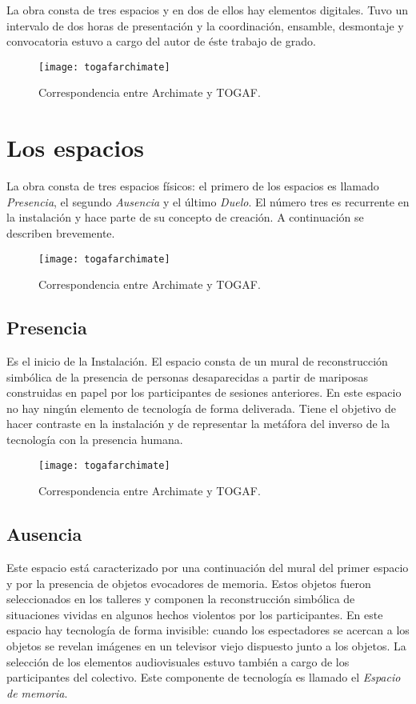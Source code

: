 La obra consta de tres espacios y en dos de ellos hay elementos digitales. Tuvo un intervalo de dos horas de presentación y la coordinación, ensamble, desmontaje y convocatoria estuvo a cargo del autor de éste trabajo de grado.

\begin{figure}[h]\label{togafarchimate}
\centering
\texttt{[image: togafarchimate]}
\caption{Correspondencia entre Archimate y TOGAF.}
\end{figure}

\section{Los espacios}

La obra consta de tres espacios físicos: el primero de los espacios es llamado \textit{Presencia}, el segundo \textit{Ausencia} y el último \textit{Duelo}. El número tres es recurrente en la instalación y hace parte de su concepto de creación. A continuación se describen brevemente.

\begin{figure}[h]\label{togafarchimate}
\centering
\texttt{[image: togafarchimate]}
\caption{Correspondencia entre Archimate y TOGAF.}
\end{figure}

\subsection{Presencia}

Es el inicio de la Instalación. El espacio consta de un mural de reconstrucción simbólica de la presencia de personas desaparecidas a partir de mariposas construidas en papel por los participantes de sesiones anteriores. En este espacio no hay ningún elemento de tecnología de forma deliverada. Tiene el objetivo de hacer contraste en la instalación y de representar la metáfora del inverso de la tecnología con la presencia humana. 

\begin{figure}[h]\label{togafarchimate}
\centering
\texttt{[image: togafarchimate]}
\caption{Correspondencia entre Archimate y TOGAF.}
\end{figure}

\subsection{Ausencia}

Este espacio está caracterizado por una continuación del mural del primer espacio y por la presencia de objetos evocadores de memoria. Estos objetos fueron seleccionados en los talleres y componen la reconstrucción simbólica de situaciones vividas en algunos hechos violentos por los participantes. En este espacio hay tecnología de forma invisible: cuando los espectadores se acercan a los objetos se revelan imágenes en un televisor viejo dispuesto junto a los objetos. La selección de los elementos audiovisuales estuvo también a cargo de los participantes del colectivo. Este componente de tecnología es llamado el \textit{Espacio de memoria}.

